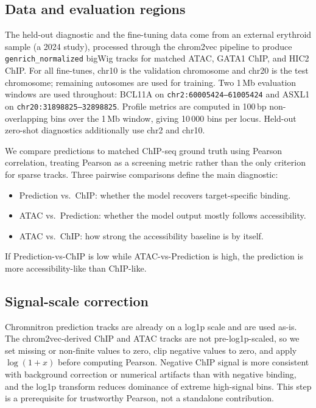 \documentclass[nohyperref]{article}
\begin{document}
\subsection{Data and evaluation regions}

The held-out diagnostic and the fine-tuning data come from an external erythroid sample (a 2024 study), processed through the chrom2vec pipeline to produce \texttt{genrich\_normalized} bigWig tracks for matched ATAC, GATA1 ChIP, and HIC2 ChIP. For all fine-tunes, chr10 is the validation chromosome and chr20 is the test chromosome; remaining autosomes are used for training. Two 1\,Mb evaluation windows are used throughout: BCL11A on \texttt{chr2:60005424--61005424} and ASXL1 on \texttt{chr20:31898825--32898825}. Profile metrics are computed in 100\,bp non-overlapping bins over the 1\,Mb window, giving 10\,000 bins per locus. Held-out zero-shot diagnostics additionally use chr2 and chr10.

We compare predictions to matched ChIP-seq ground truth using Pearson correlation, treating Pearson as a screening metric rather than the only criterion for sparse tracks. Three pairwise comparisons define the main diagnostic:
\begin{itemize}
    \item Prediction vs.\ ChIP: whether the model recovers target-specific binding.
    \item ATAC vs.\ Prediction: whether the model output mostly follows accessibility.
    \item ATAC vs.\ ChIP: how strong the accessibility baseline is by itself.
\end{itemize}
If Prediction-vs-ChIP is low while ATAC-vs-Prediction is high, the prediction is more accessibility-like than ChIP-like.

\subsection{Signal-scale correction}

Chromnitron prediction tracks are already on a log1p scale and are used as-is. The chrom2vec-derived ChIP and ATAC tracks are not pre-log1p-scaled, so we set missing or non-finite values to zero, clip negative values to zero, and apply $\log(1+x)$ before computing Pearson. Negative ChIP signal is more consistent with background correction or numerical artifacts than with negative binding, and the log1p transform reduces dominance of extreme high-signal bins. This step is a prerequisite for trustworthy Pearson, not a standalone contribution.
\end{document}
